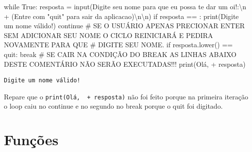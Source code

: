\documentclass[
  letterpaper,
  DIV=11,
  numbers=noendperiod]{scrreprt}
\newenvironment{Shaded}{\begin{snugshade}}{\end{snugshade}}
\newcommand{\BuiltInTok}[1]{\textcolor[rgb]{0.00,0.23,0.31}{#1}}
\newcommand{\CharTok}[1]{\textcolor[rgb]{0.13,0.47,0.30}{#1}}
\newcommand{\CommentTok}[1]{\textcolor[rgb]{0.37,0.37,0.37}{#1}}
\newcommand{\ControlFlowTok}[1]{\textcolor[rgb]{0.00,0.23,0.31}{#1}}
\newcommand{\NormalTok}[1]{\textcolor[rgb]{0.00,0.23,0.31}{#1}}
\newcommand{\OperatorTok}[1]{\textcolor[rgb]{0.37,0.37,0.37}{#1}}
\newcommand{\StringTok}[1]{\textcolor[rgb]{0.13,0.47,0.30}{#1}}
\newcommand{\VariableTok}[1]{\textcolor[rgb]{0.07,0.07,0.07}{#1}}
\begin{document}
\begin{Shaded}
\begin{Highlighting}[]
\ControlFlowTok{while} \VariableTok{True}\NormalTok{:}
\NormalTok{    resposta }\OperatorTok{=} \BuiltInTok{input}\NormalTok{(}\StringTok{\textquotesingle{}Digite seu nome para que eu possa te dar um oi!:}\CharTok{\textbackslash{}n}\StringTok{\textquotesingle{}} \OperatorTok{+} \StringTok{\textquotesingle{}(Entre com "quit" para sair da aplicacao)}\CharTok{\textbackslash{}n\textbackslash{}n}\StringTok{\textquotesingle{}}\NormalTok{)}
    \ControlFlowTok{if}\NormalTok{ resposta }\OperatorTok{==} \StringTok{\textquotesingle{}\textquotesingle{}}\NormalTok{:}
        \BuiltInTok{print}\NormalTok{(}\StringTok{\textquotesingle{}Digite um nome válido!\textquotesingle{}}\NormalTok{)}
        \ControlFlowTok{continue}
    \CommentTok{\# SE O USUÁRIO APENAS PRECIONAR ENTER SEM ADICIONAR SEU NOME O CICLO REINICIARÁ E PEDIRA NOVAMENTE PARA QUE}
    \CommentTok{\# DIGITE SEU NOME.}
    \ControlFlowTok{if}\NormalTok{ resposta.lower() }\OperatorTok{==} \StringTok{\textquotesingle{}quit\textquotesingle{}}\NormalTok{:}
        \ControlFlowTok{break}
    \CommentTok{\# SE CAIR NA CONDIÇÃO DO \textasciigrave{}BREAK\textasciigrave{} AS LINHAS ABAIXO DESTE COMENTÁRIO NÃO SERÃO EXECUTADAS!!!}
    \BuiltInTok{print}\NormalTok{(}\StringTok{\textquotesingle{}Olá, \textquotesingle{}} \OperatorTok{+}\NormalTok{ resposta)}
\end{Highlighting}
\end{Shaded}

\begin{tcolorbox}[enhanced jigsaw, breakable, leftrule=.75mm, left=2mm, opacityback=0, bottomrule=.15mm, toprule=.15mm, rightrule=.15mm, arc=.35mm, colback=white]

\begin{verbatim}
Digite um nome válido!
\end{verbatim}

\end{tcolorbox}

Repare que o
\texttt{print(\textquotesingle{}Olá,\ \textquotesingle{}\ +\ resposta)}
não foi feito porque na primeira iteração o loop caiu no continue e no
segundo no break porque o quit foi digitado.


\hypertarget{funuxe7uxf5es-1}{%
\chapter{Funções}\label{funuxe7uxf5es-1}}
\end{document}
